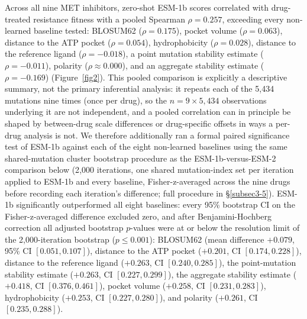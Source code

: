 \documentclass[pdflatex,sn-mathphys-num]{sn-jnl}%
\theoremstyle{thmstyleone}%
\theoremstyle{thmstyletwo}%
\theoremstyle{thmstylethree}%
\begin{document}
Across all nine MET inhibitors, zero-shot ESM-1b scores correlated with drug-treated resistance fitness with a pooled Spearman $\rho = 0.257$, exceeding every non-learned baseline tested: BLOSUM62 ($\rho = 0.175$), pocket volume ($\rho = 0.063$), distance to the ATP pocket ($\rho = 0.054$), hydrophobicity ($\rho = 0.028$), distance to the reference ligand ($\rho = -0.018$), a point mutation stability estimate ($\rho = -0.011$), polarity ($\rho \approx 0.000$), and an aggregate stability estimate ($\rho = -0.169$) (Figure~\ref{fig2}). This pooled comparison is explicitly a descriptive summary, not the primary inferential analysis: it repeats each of the 5{,}434 mutations nine times (once per drug), so the $n=9\times5{,}434$ observations underlying it are not independent, and a pooled correlation can in principle be shaped by between-drug scale differences or drug-specific offsets in ways a per-drug analysis is not. We therefore additionally ran a formal paired significance test of ESM-1b against each of the eight non-learned baselines using the same shared-mutation cluster bootstrap procedure as the ESM-1b-versus-ESM-2 comparison below (2{,}000 iterations, one shared mutation-index set per iteration applied to ESM-1b and every baseline, Fisher-z-averaged across the nine drugs before recording each iteration's difference; full procedure in \S\ref{subsec3-5}). ESM-1b significantly outperformed all eight baselines: every 95\% bootstrap CI on the Fisher-z-averaged difference excluded zero, and after Benjamini-Hochberg correction all adjusted bootstrap $p$-values were at or below the resolution limit of the 2{,}000-iteration bootstrap ($p \leq 0.001$): BLOSUM62 (mean difference $+0.079$, 95\% CI $[0.051, 0.107]$), distance to the ATP pocket ($+0.201$, CI $[0.174, 0.228]$), distance to the reference ligand ($+0.263$, CI $[0.240, 0.285]$), the point-mutation stability estimate ($+0.263$, CI $[0.227, 0.299]$), the aggregate stability estimate ($+0.418$, CI $[0.376, 0.461]$), pocket volume ($+0.258$, CI $[0.231, 0.283]$), hydrophobicity ($+0.253$, CI $[0.227, 0.280]$), and polarity ($+0.261$, CI $[0.235, 0.288]$).
\end{document}
